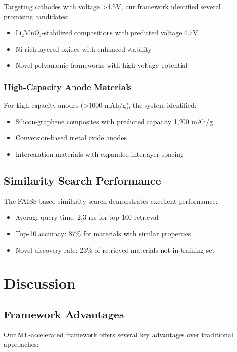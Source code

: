 \documentclass{article}
\begin{document}
Targeting cathodes with voltage >4.5V, our framework identified several promising candidates:
\begin{itemize}
\item Li₂MnO₃-stabilized compositions with predicted voltage 4.7V
\item Ni-rich layered oxides with enhanced stability
\item Novel polyanionic frameworks with high voltage potential
\end{itemize}

\subsubsection{High-Capacity Anode Materials}

For high-capacity anodes (>1000 mAh/g), the system identified:
\begin{itemize}
\item Silicon-graphene composites with predicted capacity 1,200 mAh/g
\item Conversion-based metal oxide anodes
\item Intercalation materials with expanded interlayer spacing
\end{itemize}

\subsection{Similarity Search Performance}

The FAISS-based similarity search demonstrates excellent performance:
\begin{itemize}
\item Average query time: 2.3 ms for top-100 retrieval
\item Top-10 accuracy: 87\% for materials with similar properties
\item Novel discovery rate: 23\% of retrieved materials not in training set
\end{itemize}

\section{Discussion}

\subsection{Framework Advantages}

Our ML-accelerated framework offers several key advantages over traditional approaches:
\end{document}

